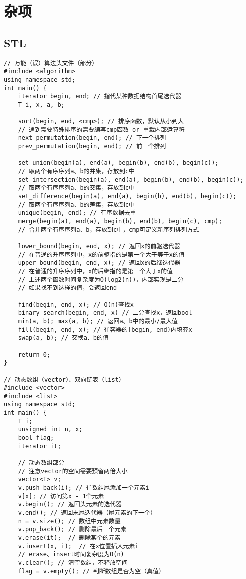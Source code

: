 \section{杂项}

\subsection{STL}
\begin{lstlisting}
// 万能（误）算法头文件（部分）
#include <algorithm>
using namespace std; 
int main() {
    iterator begin, end; // 指代某种数据结构首尾迭代器
    T i, x, a, b;
    
    sort(begin, end, <cmp>); // 排序函数，默认从小到大
    // 遇到需要特殊排序的需要编写cmp函数 or 重载内部运算符
    next_permutation(begin, end); // 下一个排列
    prev_permutation(begin, end); // 前一个排列
    
    set_union(begin(a), end(a), begin(b), end(b), begin(c));
    // 取两个有序序列a、b的并集，存放到c中
    set_intersection(begin(a), end(a), begin(b), end(b), begin(c));
    // 取两个有序序列a、b的交集，存放到c中
    set_difference(begin(a), end(a), begin(b), end(b), begin(c));
    // 取两个有序序列a、b的差集，存放到c中
    unique(begin, end); // 有序数据去重
    merge(begin(a), end(a), begin(b), end(b), begin(c), cmp);
    // 合并两个有序序列a、b，存放到c中，cmp可定义新序列排列方式
    
    lower_bound(begin, end, x); // 返回x的前驱迭代器
    // 在普通的升序序列中，x的前驱指的是第一个大于等于x的值
    upper_bound(begin, end, x); // 返回x的后继迭代器
    // 在普通的升序序列中，x的后继指的是第一个大于x的值
    // 上述两个函数时间复杂度为O(log2(n))，内部实现是二分
    // 如果找不到这样的值，会返回end
    
    find(begin, end, x); // O(n)查找x
    binary_search(begin, end, x) // 二分查找x，返回bool
    min(a, b); max(a, b); // 返回a、b中的最小/最大值
    fill(begin, end, x); // 往容器的[begin, end)内填充x
    swap(a, b); // 交换a、b的值
    
    return 0;
}

// 动态数组（vector）、双向链表（list）
#include <vector>
#include <list>
using namespace std;
int main() {
    T i;
    unsigned int n, x;
    bool flag;
    iterator it;
    
    // 动态数组部分
    // 注意vector的空间需要预留两倍大小
    vector<T> v;
    v.push_back(i); // 往数组尾添加一个元素i
    v[x]; // 访问第x - 1个元素
    v.begin(); // 返回头元素的迭代器
    v.end(); // 返回末尾迭代器（尾元素的下一个）
    n = v.size(); // 数组中元素数量
    v.pop_back(); // 删除最后一个元素
    v.erase(it);  // 删除某个的元素
    v.insert(x, i);  // 在x位置插入元素i
    // erase、insert时间复杂度为O(n)
    v.clear(); // 清空数组，不释放空间
    flag = v.empty(); // 判断数组是否为空（真值）
    

\end{lstlisting}
